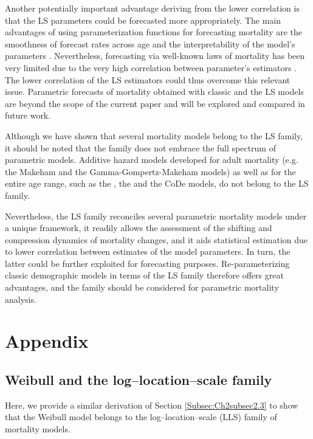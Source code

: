 \documentclass[Thesis]{subfiles}
\begin{document}
Another potentially important advantage deriving from the lower correlation is that the LS parameters could be forecasted more appropriately. The main advantages of using parameterization functions for forecasting mortality are the smoothness of forecast rates across age and the interpretability of the model's parameters \citep{bell1997comparing,booth2008mortality}. Nevertheless, forecasting via well-known laws of mortality has been very limited due to the very high correlation between parameter's estimators \citep{booth2008mortality}. The lower correlation of the LS estimators could thus overcome this relevant issue. Parametric forecasts of mortality obtained with classic and the LS models are beyond the scope of the current paper and will be explored and compared in future work.

Although we have shown that several mortality models belong to the LS family, it should be noted that the family does not embrace the full spectrum of parametric  models. Additive hazard models developed for adult mortality (e.g. the Makeham and the Gamma-Gompertz-Makeham models) as well as for the entire age range, such as the \cite{siler1979competing}, the \cite{heligman1980age} and the CoDe \citep{de2016new} models,  do not belong to the LS family.

Nevertheless, the LS family reconciles several parametric mortality models under a unique framework, it readily allows the assessment of the shifting and compression dynamics of mortality changes, and it aids statistical estimation due to lower correlation between estimates of the model parameters. In turn, the latter could be further exploited for forecasting purposes. Re-parameterizing classic demographic models in terms of the LS family therefore offers great advantages, and the family should be considered for parametric mortality analysis.


\section{Appendix}\label{Sec:Ch2Appendix}

\subsection{Weibull and the log--location--scale family}
\label{Subsec:Ch2appA}

Here, we provide a similar derivation of Section \ref{Subsec:Ch2subsec2.3} to show that the Weibull model belongs to the log--location--scale (LLS) family of mortality models.
\end{document}
